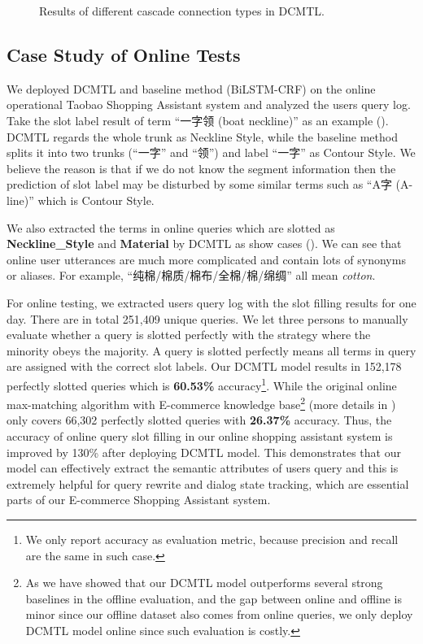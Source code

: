 \begin{figure}[h]
	\centering
	\caption{Results of different cascade connection types in DCMTL.}
	\label{fig:multi_grained}
\end{figure}

\subsection{Case Study of Online Tests}
\label{sec:case_study}
We deployed DCMTL and baseline method (BiLSTM-CRF) on the online 
operational Taobao Shopping Assistant system and analyzed the users query log.
Take the slot label result of term ``一字领 (boat neckline)'' as 
an example ().
DCMTL regards the whole trunk as Neckline Style,
while the baseline method splits it into two trunks (``一字'' and ``领'') and label ``一字'' as Contour Style.
We believe the reason is that if we do not know the segment information
then the prediction of slot label may be disturbed by some similar terms such as ``A字 (A-line)'' which is Contour Style.

We also extracted the terms in online queries which are slotted as \textbf{Neckline\_Style} and \textbf{Material} by DCMTL as show cases ().
We can see that online user utterances are much more complicated and contain 
lots of synonyms or aliases. For example, ``纯棉/棉质/棉布/全棉/棉/绵绸'' all mean \emph{cotton}.

For online testing, we extracted users query log with the slot filling results for one day. There are in total 251,409 unique queries.
We let three persons to manually evaluate whether a query is slotted perfectly with the strategy where the minority obeys the majority.
A query is slotted perfectly means all terms in query are assigned with the correct slot labels.
Our DCMTL model results in 152,178 perfectly slotted queries which is \textbf{60.53\%} accuracy\footnote{We only report accuracy as evaluation metric, because precision and recall are the same in such case.}.
While the original online max-matching algorithm with E-commerce knowledge base\footnote{As we have showed that our DCMTL model outperforms several strong baselines in the offline evaluation, and the gap between online and offline is minor since our offline dataset also comes from online queries, 
we only deploy DCMTL model online since such evaluation is costly.} 
(more details in )
only covers 66,302 perfectly slotted queries with \textbf{26.37\%} accuracy.
Thus, 
the accuracy of online query slot filling in our online shopping assistant 
system is improved by 130\% after deploying DCMTL model.
This demonstrates that our model can effectively
extract the semantic attributes of users query and this 
is extremely helpful for query rewrite and dialog state tracking,
which are essential parts of our E-commerce Shopping Assistant system.

